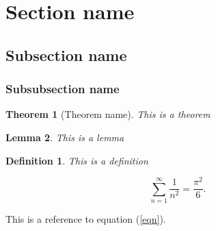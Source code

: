 \documentclass{article}
\theoremstyle{slimTheoremStyle} %
\newtheorem{theorem}{Theorem}[section]
\newtheorem{lemma}[theorem]{Lemma}
\theoremstyle{slimDefinitionStyle}
\newtheorem{definition}{Definition}[section]
\theoremstyle{remark}
\begin{document}
\section{Section name}
\subsection{Subsection name}
\subsubsection{Subsubsection name}

\begin{theorem}[Theorem name]
This is a theorem
\end{theorem}

\begin{lemma}
This is a lemma
\end{lemma}

\begin{definition}
This is a definition
\end{definition}

\begin{equation}\label{eqn}
\sum\limits_{n=1}^\infty \frac{1}{n^2} = \frac{\pi^2}{6}. 
\end{equation}

This is a reference to equation (\ref{eqn}). 



\end{document}
